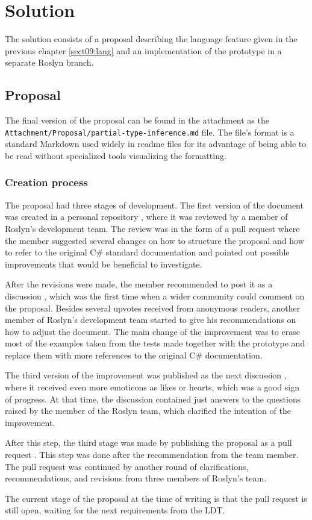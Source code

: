 \chapter{Solution}

The solution consists of a proposal describing the language feature given in the previous chapter \ref{sect09:lang} and an implementation of the prototype in a separate Roslyn branch.

\section{Proposal}

The final version of the proposal can be found in the attachment as the \texttt{Attachment/Proposal/partial-type-inference.md} file. 
The file’s format is a standard Markdown used widely in readme files for its advantage of being able to be read without specialized tools visualizing the formatting.

\subsection{Creation process}

The proposal had three stages of development. 
The first version of the document was created in a personal repository \cite{online:personalRepo}, where it was reviewed by a member of Roslyn's development team. 
The review was in the form of a pull request \cite{online:personalPull} where the member suggested several changes on how to structure the proposal and how to refer to the original C\# standard documentation and pointed out possible improvements that would be beneficial to investigate.
\par
After the revisions were made, the member recommended to post it as a discussion \cite{online:discussion1}, which was the first time when a wider community could comment on the proposal. 
Besides several upvotes received from anonymous readers, another member of Roslyn's development team started to give his recommendations on how to adjust the document. 
The main change of the improvement was to erase most of the examples taken from the tests made together with the prototype and replace them with more references to the original C\# documentation.
\par
The third version of the improvement was published as the next discussion \cite{online:discussion2}, where it received even more emoticons as likes or hearts, which was a good sign of progress. 
At that time, the discussion contained just answers to the questions raised by the member of the Roslyn team, which clarified the intention of the improvement.
\par
After this step, the third stage was made by publishing the proposal as a pull request \cite{online:pull2}. 
This step was done after the recommendation from the team member. 
The pull request was continued by another round of clarifications, recommendations, and revisions from three members of Roslyn's team.
\par
The current stage of the proposal at the time of writing is that the pull
request is still open, waiting for the next requirements from the \ac{LDT}.

